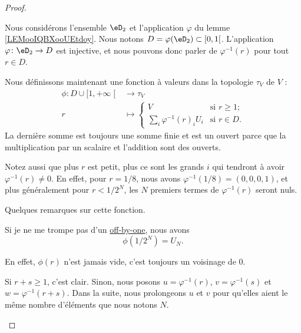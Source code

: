 \begin{proof}
\begin{subproof}
        \item[L'ensemble \( D\)]
            Nous considérons l'ensemble \( \eD_2\) et l'application \( \varphi\) du lemme \ref{LEMooIQBXooUEtdoy}. Nous notons \( D=\varphi(\eD_2)\subset\mathopen[ 0 , 1 \mathclose[\). L'application \( \varphi\colon \eD_2\to D\) est injective, et nous pouvons donc parler de \( \varphi^{-1}(r)\) pour tout \( r\in D\).
        \item[La fonction \( \phi\)]
    
        Nous définissons maintenant une fonction à valeurs dans la topologie \( \tau_V\) de \( V\) :
        \begin{equation}
            \begin{aligned}
                \phi\colon D\cup\mathopen[ 1 , +\infty \mathclose[&\to \tau_V \\
                r&\mapsto  
        \begin{cases}
            V & \text{si } r \geq 1;\\
            \sum_i\varphi^{-1}(r)_iU_i &\text{si } r\in D.
        \end{cases}
            \end{aligned}
        \end{equation}
        La dernière somme est toujours une somme finie et est un ouvert parce que la multiplication par un scalaire et l'addition sont des ouverts.

        Notez aussi que plus \( r\) est petit, plus ce sont les grands \( i\) qui tendront à avoir \( \varphi^{-1}(r)\neq 0\). En effet, pour \( r=1/8\), nous avons \( \varphi^{-1}(1/8)=(0,0,0,1)\), et plus généralement pour \( r<1/2^N\), les \( N\) premiers termes de \( \varphi^{-1}(r)\) seront nuls.

    Quelques remarques sur cette fonction.
            \begin{subproof}
            \item[Une égalité facile] Si je ne me trompe pas d'un \href{ https://fr.wikipedia.org/wiki/Erreur_off-by-one }{off-by-one}, nous avons
                \begin{equation}
                    \phi(1/2^N)=U_N.
                \end{equation}
            \item[\( 0\in \phi(r)\) pour tout \( r\)]
             En effet, \(\phi(r)\) n'est jamais vide, c'est toujours un voisinage de \(0\).
         \item[\(\phi(r) + \phi(s) \subset \phi(r+s)\)] 
             Si \(r + s \geq 1 \), c'est clair. Sinon, nous posons \( u=\varphi^{-1}(r)\), \( v=\varphi^{-1}(s)\) et $w=\varphi^{-1}(r+s)$. Dans la suite, nous prolongeons \( u\) et \( v\) pour qu'elles aient le même nombre d'éléments que nous notons \( N\).  


\end{subproof}
\end{subproof}
\end{proof}

